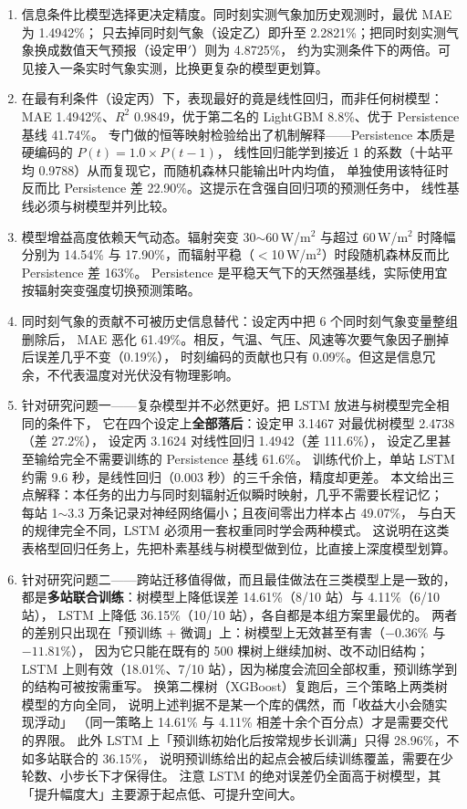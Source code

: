 \documentclass[11pt,a4paper]{ctexart}
\begin{document}
\begin{enumerate}
\item 信息条件比模型选择更决定精度。同时刻实测气象加历史观测时，最优 MAE 为 1.4942\%；
只去掉同时刻气象（设定乙）即升至 2.2821\%；把同时刻实测气象换成数值天气预报（设定甲$'$）则为 4.8725\%，
约为实测条件下的两倍。可见接入一条实时气象实测，比换更复杂的模型更划算。

\item 在最有利条件（设定丙）下，表现最好的竟是线性回归，而非任何树模型：
MAE 1.4942\%、$R^2$ 0.9849，优于第二名的 LightGBM 8.8\%、优于 Persistence 基线 41.74\%。
专门做的恒等映射检验给出了机制解释——Persistence 本质是硬编码的 $P(t)=1.0\times P(t-1)$，
线性回归能学到接近 1 的系数（十站平均 0.9788）从而复现它，而随机森林只能输出叶内均值，
单独使用该特征时反而比 Persistence 差 22.90\%。这提示在含强自回归项的预测任务中，
线性基线必须与树模型并列比较。

\item 模型增益高度依赖天气动态。辐射突变 30$\sim$60\,W/m$^2$ 与超过 60\,W/m$^2$ 时降幅分别为
14.54\% 与 17.90\%，而辐射平稳（$<$10\,W/m$^2$）时段随机森林反而比 Persistence 差 163\%。
Persistence 是平稳天气下的天然强基线，实际使用宜按辐射突变强度切换预测策略。

\item 同时刻气象的贡献不可被历史信息替代：设定丙中把 6 个同时刻气象变量整组删除后，
MAE 恶化 61.49\%。相反，气温、气压、风速等次要气象因子删掉后误差几乎不变（0.19\%），
时刻编码的贡献也只有 0.09\%。但这是信息冗余，不代表温度对光伏没有物理影响。

\item 针对研究问题一——复杂模型并不必然更好。把 LSTM 放进与树模型完全相同的条件下，
它在四个设定上\textbf{全部落后}：设定甲 3.1467 对最优树模型 2.4738（差 27.2\%），
设定丙 3.1624 对线性回归 1.4942（差 111.6\%），
设定乙里甚至输给完全不需要训练的 Persistence 基线 61.6\%。
训练代价上，单站 LSTM 约需 9.6 秒，是线性回归（0.003 秒）的三千余倍，精度却更差。
本文给出三点解释：本任务的出力与同时刻辐射近似瞬时映射，几乎不需要长程记忆；
每站 1$\sim$3.3 万条记录对神经网络偏小；且夜间零出力样本占 49.07\%，
与白天的规律完全不同，LSTM 必须用一套权重同时学会两种模式。
这说明在这类表格型回归任务上，先把朴素基线与树模型做到位，比直接上深度模型划算。

\item 针对研究问题二——跨站迁移值得做，而且最佳做法在三类模型上是一致的，
都是\textbf{多站联合训练}：树模型上降低误差 14.61\%（8/10 站）与 4.11\%（6/10 站），
LSTM 上降低 36.15\%（10/10 站），各自都是本组方案里最优的。
两者的差别只出现在「预训练 + 微调」上：树模型上无效甚至有害（$-0.36\%$ 与 $-11.81\%$），
因为它只能在既有的 500 棵树上继续加树、改不动旧结构；
LSTM 上则有效（18.01\%、7/10 站），因为梯度会流回全部权重，预训练学到的结构可被按需重写。
换第二棵树（XGBoost）复跑后，三个策略上两类树模型的方向全同，
说明上述判据不是某一个库的偶然，而「收益大小会随实现浮动」
（同一策略上 14.61\% 与 4.11\% 相差十余个百分点）才是需要交代的界限。
此外 LSTM 上「预训练初始化后按常规步长训满」只得 28.96\%，不如多站联合的 36.15\%，
说明预训练给出的起点会被后续训练覆盖，需要在少轮数、小步长下才保得住。
注意 LSTM 的绝对误差仍全面高于树模型，其「提升幅度大」主要源于起点低、可提升空间大。


\end{enumerate}
\end{document}
